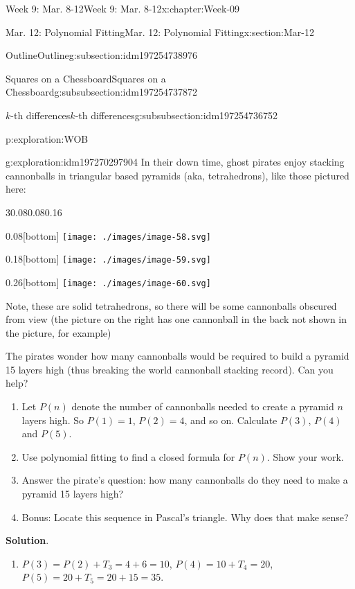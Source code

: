 \documentclass[oneside,10pt,]{book}
\newcommand{\blocktitlefont}{\relax}
\numberwithin{equation}{section}
\begin{document}
\begin{chapterptx}{Week 9: Mar. 8-12}{}{Week 9: Mar. 8-12}{}{}{x:chapter:Week-09}
\begin{sectionptx}{Mar. 12: Polynomial Fitting}{}{Mar. 12: Polynomial Fitting}{}{}{x:section:Mar-12}
\begin{subsectionptx}{Outline}{}{Outline}{}{}{g:subsection:idm197254738976}
\begin{subsubsectionptx}{Squares on a Chessboard}{}{Squares on a Chessboard}{}{}{g:subsubsection:idm197254737872}
\begin{subsubsectionptx}{\(k\)-th differences}{}{\(k\)-th differences}{}{}{g:subsubsection:idm197254736752}
\begin{exploration}{}{p:exploration:WOB}
\end{exploration}%
\begin{exploration}{}{g:exploration:idm197270297904}%
%
In their down time, ghost pirates enjoy stacking cannonballs in triangular based pyramids (aka, tetrahedrons), like those pictured here:%
\begin{sidebyside}{3}{0.08}{0.08}{0.16}%
\begin{sbspanel}{0.08}[bottom]%
\texttt{[image: ./images/image-58.svg]}
\end{sbspanel}%
\begin{sbspanel}{0.18}[bottom]%
\texttt{[image: ./images/image-59.svg]}
\end{sbspanel}%
\begin{sbspanel}{0.26}[bottom]%
\texttt{[image: ./images/image-60.svg]}
\end{sbspanel}%
\end{sidebyside}%
\par
Note, these are solid tetrahedrons, so there will be some cannonballs obscured from view (the picture on the right has one cannonball in the back not shown in the picture, for example)%
\par
The pirates wonder how many cannonballs would be required to build a pyramid 15 layers high (thus breaking the world cannonball stacking record). Can you help?%
\begin{enumerate}
\item{}Let \(P(n)\) denote the number of cannonballs needed to create a pyramid \(n\) layers high. So \(P(1) = 1\), \(P(2) = 4\), and so on. Calculate \(P(3)\), \(P(4)\) and \(P(5)\).%
\item{}Use polynomial fitting to find a closed formula for \(P(n)\). Show your work.%
\item{}Answer the pirate's question: how many cannonballs do they need to make a pyramid 15 layers high?%
\item{}Bonus: Locate this sequence in Pascal's triangle. Why does that make sense? %
\end{enumerate}
%
\par\smallskip%
\noindent\textbf{\blocktitlefont Solution}.\hypertarget{g:solution:idm197270280592}{}\quad{}%
\begin{enumerate}
\item{}\(P(3) = P(2) + T_3 = 4 + 6 = 10\), \(P(4) = 10 + T_4 = 20\), \(P(5) = 20 + T_5 = 20 + 15 = 35\).%

\end{enumerate}
\end{exploration}
\end{subsubsectionptx}
\end{subsubsectionptx}
\end{subsectionptx}
\end{sectionptx}
\end{chapterptx}
\end{document}
